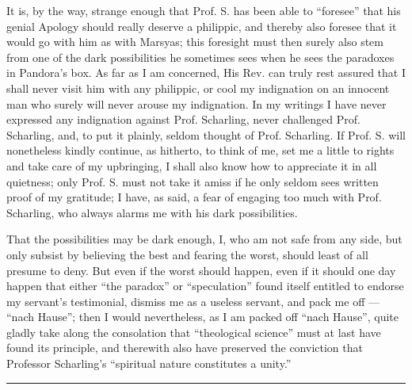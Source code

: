\documentclass[12pt,a4paper,openany]{book}
\newcommand{\opage}[1]{\marginnote{\footnotesize\textit{[#1]}}}
\begin{document}
It is, by the way, strange enough that Prof. S. has
been able to ``foresee'' that his genial Apology should really
\setcounter{footnote}{0}%
\opage{24}deserve a philippic, and thereby also foresee that it would
go with him as with Marsyas; this foresight must then surely also
stem from one of the dark possibilities he sometimes
sees when he sees the paradoxes in Pandora's box.
As far as I am concerned, His Rev. can truly rest assured
that I shall never visit him with any philippic,
or cool my indignation on an innocent man who
surely will never arouse my indignation. In my writings I have
never expressed any indignation against Prof. Scharling, never
challenged Prof. Scharling, and, to put it plainly, seldom %
thought of Prof. Scharling. If Prof. S. will nonetheless
kindly continue, as hitherto, to think of me, set
me a little to rights and take care of my upbringing,
I shall also know how to appreciate it in all quietness; only
Prof. S. must not take it amiss if he only seldom sees
written proof of my gratitude; I have, as
said, a fear of engaging too much with Prof.
Scharling, who always alarms me with his dark possibilities.


That the possibilities may be dark enough,
I, who am not safe from any side, but only subsist
by believing the best and fearing the worst, should
least of all presume to deny. But even
if the worst should happen, even if it should one day
happen that either ``the paradox'' or ``speculation'' found
itself entitled to endorse my servant's testimonial, dismiss
me as a useless servant, and pack me off ---
``nach Hause''; then I would nevertheless, as I am packed off ``nach
Hause'', quite gladly take along the consolation that ``theological
science'' must at last have found its principle, and
therewith also have preserved the conviction that Professor
Scharling's ``spiritual nature constitutes a unity.''

\begin{center}\rule{4em}{0.4pt}\end{center}
\end{document}
